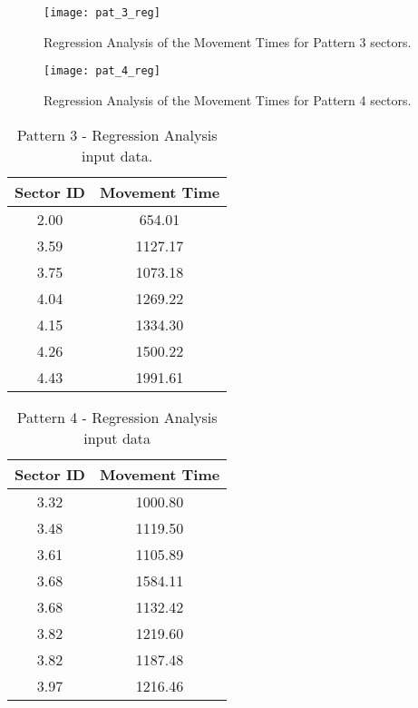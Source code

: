 			\begin{figure}[]
				\centering
				\texttt{[image: pat\_3\_reg]}
				\caption{Regression Analysis of the Movement Times for Pattern 3 sectors.}
				\label{fig_pat_3_reg}
			\end{figure}
		
			\begin{figure}[]
				\centering
				\texttt{[image: pat\_4\_reg]}
				\caption{Regression Analysis of the Movement Times for Pattern 4 sectors.}
				\label{fig_pat_4_reg}
			\end{figure}
			
			\begin{table}[]
				\centering
				\caption{Pattern 3 - Regression Analysis input data.}
				\label{tab_pat_3_reg}
				\begin{tabular}{|c|c|}
					\hline
					\textbf{Sector ID} & \textbf{Movement Time} \\ \hline
					2.00               & 654.01                 \\ \hline
					3.59               & 1127.17                \\ \hline
					3.75               & 1073.18                \\ \hline
					4.04               & 1269.22                \\ \hline
					4.15               & 1334.30                \\ \hline
					4.26               & 1500.22                \\ \hline
					4.43               & 1991.61                \\ \hline
				\end{tabular}
			\end{table}
			
			\begin{table}[]
				\centering
				\caption{Pattern 4 - Regression Analysis input data}
				\label{tab_pat_4_reg}
				\begin{tabular}{|c|c|}
					\hline
					\textbf{Sector ID} & \textbf{Movement Time} \\ \hline
					3.32               & 1000.80                \\ \hline
					3.48               & 1119.50                \\ \hline
					3.61               & 1105.89                \\ \hline
					3.68               & 1584.11                \\ \hline
					3.68               & 1132.42                \\ \hline
					3.82               & 1219.60                \\ \hline
					3.82               & 1187.48                \\ \hline
					3.97               & 1216.46                \\ \hline
				\end{tabular}
			\end{table}
		
